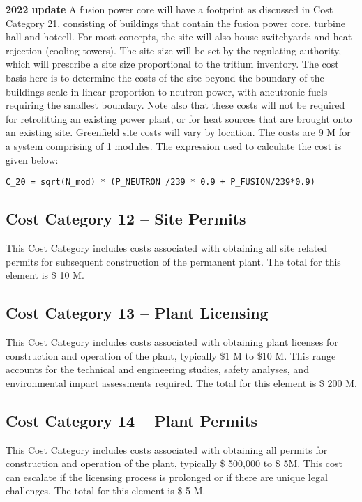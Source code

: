  \textbf{2022 update} 
A fusion power core will have a footprint as discussed in Cost Category 21, consisting of buildings that contain the fusion power core, turbine hall and hotcell. For most concepts, the site will also house switchyards and heat rejection (cooling towers). The site size will be set by the regulating authority, which will prescribe a site size proportional to the tritium inventory.  The cost basis here is to determine the costs of the site beyond the boundary of the buildings scale in linear proportion to neutron power, with aneutronic fuels requiring the smallest boundary.  Note also that these costs will not be required for retrofitting an existing power plant, or for heat sources that are brought onto an existing site.  Greenfield site costs will vary by location. The costs are 9 M for a system comprising of 1 modules. 
 The expression used to calculate the cost is given below: 
\begin{verbatim} 
C_20 = sqrt(N_mod) * (P_NEUTRON /239 * 0.9 + P_FUSION/239*0.9)\end{verbatim} 


\subsection*{Cost Category 12 – Site Permits} 
This Cost Category includes costs associated with obtaining all site related permits for subsequent construction of the permanent plant.  The total for this element is \$ 10 M.

\subsection*{Cost Category 13 – Plant Licensing} 
This Cost Category includes costs associated with obtaining plant licenses for construction and operation of the plant, typically \$1 M to \$10 M. This range accounts for the technical and engineering studies, safety analyses, and environmental impact assessments required.  The total for this element is \$ 200 M.

\subsection*{Cost Category 14 – Plant Permits} 
This Cost Category includes costs associated with obtaining all permits for construction and operation of the plant, typically \$ 500,000 to \$ 5M. This cost can escalate if the licensing process is prolonged or if there are unique legal challenges.  The total for this element is \$ 5 M.

